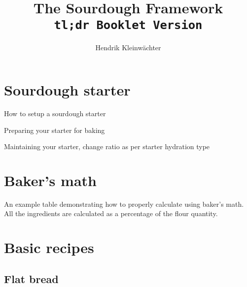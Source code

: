 \documentclass[paper=a4, twoside=false, fontsize=12pt]{scrbook}
\author{Hendrik Kleinwächter}
\title{The Sourdough Framework\\\texttt{tl;dr Booklet Version}}
\begin{document}
\maketitle

\section*{Sourdough starter}
\begin{flowchart}[!htb]
    \centering
    
    \caption*{How to setup a sourdough starter}
\end{flowchart}

\begin{flowchart}[!htb]
    \centering
    
    \caption*{Preparing your starter for baking}
\end{flowchart}

\begin{flowchart}[!htb]
    \centering
    
    \caption*{Maintaining your starter, change ratio as per starter hydration
    type}
\end{flowchart}

\clearpage{}
\section*{Baker's math}
\begin{table}[!htb]
  \centering
  
  \caption*{An example table demonstrating how to properly calculate using
  baker's math. All the ingredients are calculated as a percentage of the
flour quantity.}
\end{table}

\section*{Basic recipes}
\subsection*{Flat bread}

\clearpage{}
\end{document}
